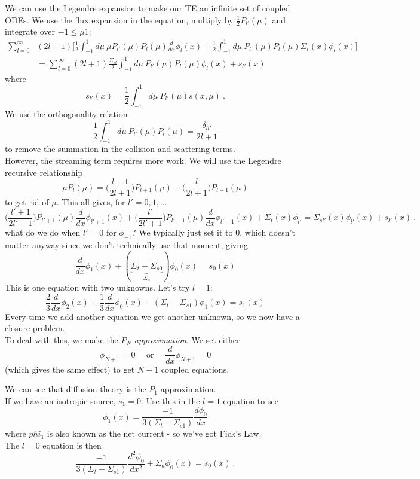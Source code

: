 \documentclass[12pt]{article}
\begin{document}
We can use the Legendre expansion to make our TE an infinite set of coupled ODEs. We use the flux expansion in the equation, multiply by $\frac{1}{2}P_{l'}(\mu)$ and integrate over $-1 \leq \mu 1$:
\begin{align*}
\sum_{l=0}^{\infty} &(2l+1)\biggl[ \frac{1}{2} \int_{-1}^1 d\mu\: \mu P_{l'}(\mu) P_l(\mu) \frac{d}{d x}\phi_l(x) + \frac{1}{2} \int_{-1}^1 d\mu\: P_{l'}(\mu) P_l(\mu) \Sigma_t(x)\phi_l(x) \biggr] \\
&= \sum_{l=0}^{\infty} (2l+1)\frac{\Sigma_{sl}}{2}\int_{-1}^1 d\mu\: P_{l'}(\mu) P_l(\mu) \phi_l(x) + s_{l'}(x)
\end{align*}
where
\[
s_{l'}(x) = \frac{1}{2} \int_{-1}^1 d\mu\:P_{l'}(\mu) s(x,\mu)\:.
\]
We use the orthogonality relation
\[
\frac{1}{2} \int_{-1}^1 d\mu\: P_{l'}(\mu) P_l(\mu) = \frac{\delta_{l l'}}{2l+1}
\]
to remove the summation in the collision and scattering terms. \\
However, the streaming term requires more work. We will use the Legendre recursive relationship
\[
\mu P_l(\mu) = \bigl(\frac{l+1}{2l+1}\bigr)P_{l+1}(\mu) + \bigl(\frac{l}{2l+1}\bigr)P_{l-1}(\mu)
\]
to get rid of $\mu$. This all gives, for $l' = 0, 1, \dots$
\[
\bigl(\frac{l'+1}{2l'+1}\bigr)P_{l'+1}(\mu)\frac{d}{d x}\phi_{l'+1}(x) + \bigl(\frac{l'}{2l'+1}\bigr)P_{l'-1}(\mu)\frac{d}{d x}\phi_{l'-1}(x) + \Sigma_t(x) \phi_{l'} = \Sigma_{sl'}(x)\phi_{l'}(x) + s_{l'}(x)\:.
\]
what do we do when $l'=0$ for $\phi_{-1}$? We typically just set it to $0$, which doesn't matter anyway since we don't technically use that moment, giving
\[
\frac{d}{dx}\phi_1(x) + (\underbrace{\Sigma_t - \Sigma_{s0}}_{\Sigma_a})\phi_0(x) = s_0(x)
\]
This is one equation with two unknowns. Let's try $l=1$:
\[
\frac{2}{3}\frac{d}{dx}\phi_2(x) + \frac{1}{3}\frac{d}{dx}\phi_0(x) + (\Sigma_t - \Sigma_{s1})\phi_1(x) = s_1(x)
\]
Every time we add another equation we get another unknown, so we now have a closure problem.\\
To deal with this, we make the $P_N$ \textit{approximation}. We set either 
\[\phi_{N+1} = 0 \quad\text{ or }\quad\frac{d}{dx}\phi_{N+1}=0
\]
(which gives the same effect) to get $N+1$ coupled equations. 

We can see that diffusion theory is the $P_1$ approximation.\\
If we have an isotropic source, $s_1=0$. Use this in the $l=1$ equation to see
\[
\phi_1(x) = \frac{-1}{3(\Sigma_t - \Sigma_{s1})}\frac{d \phi_0}{dx}
\]
where $phi_1$ is also known as the net current - so we've got Fick's Law.\\
The $l=0$ equation is then
\[
\frac{-1}{3(\Sigma_t - \Sigma_{s1})}\frac{d^2 \phi_0}{dx^2} + \Sigma_a \phi_0(x) = s_0(x)\:.
\]




 
\end{document}
